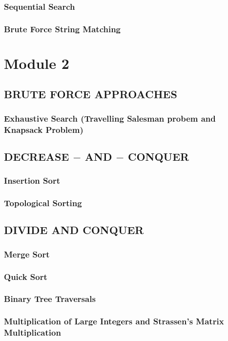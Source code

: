 \documentclass{article}
\begin{document}
	\subsubsection{Sequential Search}
	\subsubsection{Brute Force String Matching}
	\newpage

	\section{Module 2}
	\subsection{BRUTE FORCE APPROACHES}
	\subsubsection{Exhaustive Search (Travelling Salesman probem and Knapsack Problem)}

	\subsection{DECREASE $-$ AND $-$ CONQUER}
	\subsubsection{Insertion Sort}
	\subsubsection{Topological Sorting}

	\subsection{DIVIDE AND CONQUER}
	\subsubsection{Merge Sort}
	\subsubsection{Quick Sort}
	\subsubsection{Binary Tree Traversals}
	\subsubsection{Multiplication of Large Integers and Strassen's Matrix Multiplication}
	\newpage
\end{document}
